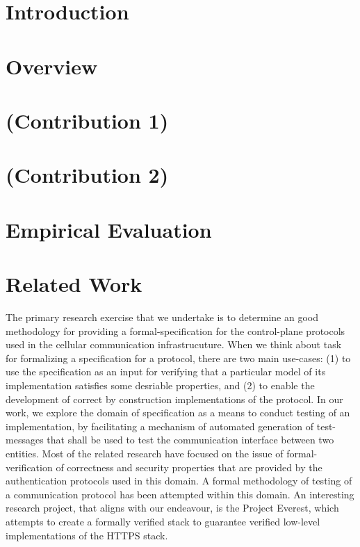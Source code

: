 \documentclass[acmsmall,review,authorversion]{acmart}
\begin{document}
\maketitle

\section{Introduction}

\section{Overview}

\section{(Contribution 1)}

\section{(Contribution 2)}

\section{Empirical Evaluation}

\section{Related Work}
  The primary research exercise that we undertake is to determine an good methodology for providing a formal-specification for the control-plane protocols used in the cellular communication infrastrucuture. When we think about task for formalizing a specification for a protocol, there are two main use-cases: (1) to use the specification as an input for verifying that a particular model of its implementation satisfies some desriable properties, and (2) to enable the development of correct by construction implementations of the protocol. In our work, we explore the domain of specification as a means to conduct testing of an implementation, by facilitating a mechanism of automated generation of test-messages that shall be used to test the communication interface between two entities. Most of the related research have focused on the issue of formal-verification of correctness and security properties that are provided by the authentication protocols used in this domain. A formal methodology of testing of a communication protocol has been attempted within this domain. An interesting research project, that aligns with our endeavour, is the Project Everest, which attempts to create a formally verified stack to guarantee verified low-level implementations of the HTTPS stack. 
  
\end{document}
